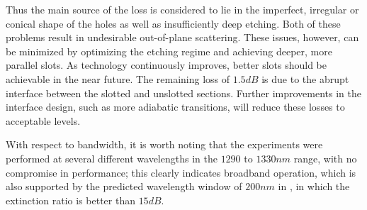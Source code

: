 Thus the main source of the loss is considered to lie in the
imperfect, irregular or conical shape of the holes as well as
insufficiently deep etching. Both of these problems result in
undesirable out-of-plane scattering. These issues, however, can be
minimized by optimizing the etching regime and achieving deeper, more
parallel slots. As technology continuously improves, better slots
should be achievable in the near future. The remaining loss of $1.5
dB$ is due to the abrupt interface between the slotted and unslotted
sections. Further improvements in the interface design, such as more
adiabatic transitions, will reduce these losses to acceptable levels.
 
With respect to bandwidth, it is worth noting that the experiments
were performed at several different wavelengths in the $1290$ to $1330
nm$ range, with no compromise in performance; this clearly indicates
broadband operation, which is also supported by the predicted
wavelength window of $200 nm$ in , in
which the extinction ratio is better than $15 dB$.

